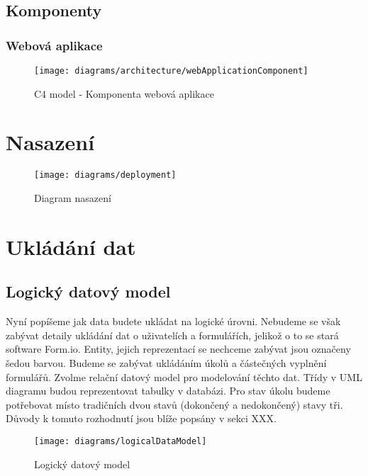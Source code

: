\subsection{Komponenty}\label{subsec:komponenty}

\subsubsection{Webová aplikace}

\begin{figure}[H]
    \texttt{[image: diagrams/architecture/webApplicationComponent]}
    \caption{C4 model - Komponenta webová aplikace}\label{fig:architecture-component-web-application}
\end{figure}


\section{Nasazení}\label{sec:deployment}

\begin{figure}[H]
    \texttt{[image: diagrams/deployment]}
    \caption{Diagram nasazení}\label{fig:deployment}
\end{figure}


\section{Ukládání dat}\label{sec:ukladani-dat}

\subsection{Logický datový model}\label{subsec:logicky-datovy-model}

Nyní popíšeme jak data budete ukládat na logické úrovni.
Nebudeme se však zabývat detaily ukládání dat o uživatelích a formulářích, jelikož o to se stará software Form.io.
Entity, jejich reprezentací se nechceme zabývat jsou označeny šedou barvou.
Budeme se zabývat ukládáním úkolů a částečných vyplnění formulářů.
Zvolme relační datový model pro modelování těchto dat.
Třídy v UML diagramu budou reprezentovat tabulky v databázi.
Pro stav úkolu budeme potřebovat místo tradičních dvou stavů (dokončený a nedokončený) stavy tři.
Důvody k tomuto rozhodnutí jsou blíže popsány v sekci XXX. %

\begin{figure}[H]
    \texttt{[image: diagrams/logicalDataModel]}
    \caption{Logický datový model}\label{fig:logical-data-model}
\end{figure}

